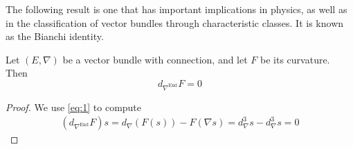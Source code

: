 The following result is one that has important implications in physics, as well as in the classification of vector bundles through characteristic classes. It is known as the Bianchi identity.
\begin{theorem}
  Let $(E,\nabla)$ be a vector bundle with connection, and let $F$ be its curvature. Then
  $$d_{\nabla^\text{End}}F=0$$
\end{theorem}
\begin{proof}
  We use \ref{eq:1} to compute
  \begin{align*}
    (d_{\nabla^\text{End}}F)s=d_\nabla(F(s))-F(\nabla s)=d_\nabla^3s-d_\nabla^3s=0
  \end{align*}
\end{proof}
